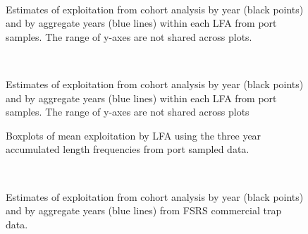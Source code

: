 \begin{figure}
        \centering
         \\
                    
                    \caption{Estimates of exploitation from cohort analysis by year (black points) and by aggregate years (blue lines) within each LFA from port samples. The range of y-axes are not shared across plots.}
        \end{figure}

\begin{figure}
        \centering
         \\
                     \caption{Estimates of exploitation from cohort analysis by year (black points) and by aggregate years (blue lines) within each LFA from port samples. The range of y-axes are not shared across plots}
        \end{figure}


\begin{figure}
\centering
              \caption{Boxplots of mean exploitation by LFA using the three year accumulated length frequencies from port sampled data.}
\end{figure}

\begin{figure}
        \centering
         \\
                     \caption{Estimates of exploitation from cohort analysis by year (black points) and by aggregate years (blue lines) from FSRS commercial trap data.}
        \end{figure}


